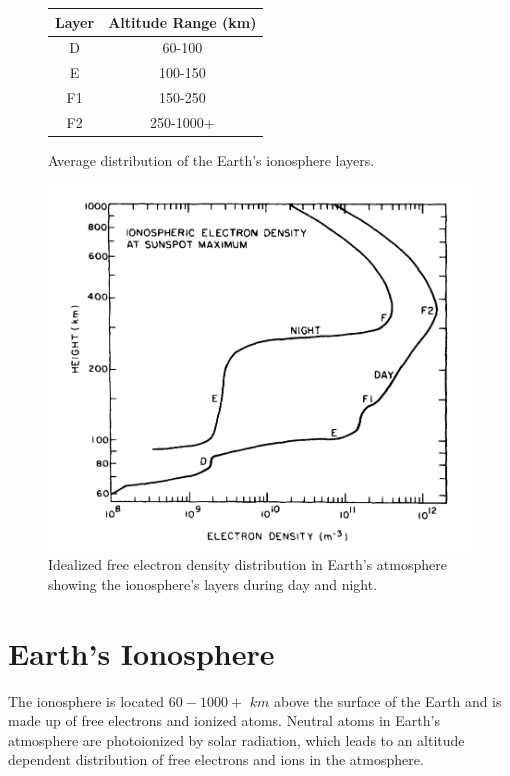 \begin{figure}[htb]
\centering
\begin{minipage}[b]{0.48\textwidth}
\centering
\begin{tabular}{|c|c|}
\hline
Layer & Altitude Range (km) \\
\hline
D & 60-100 \\
\hline
E & 100-150 \\
\hline
F1 & 150-250 \\
\hline
F2 & 250-1000+ \\
\hline
\end{tabular}
\caption{Average distribution of the Earth's ionosphere layers.}
\label{Tab:iono_layer}
\vspace{2cm}
\end{minipage}%
\begin{minipage}[b]{0.02\textwidth}
\hspace{1cm}
\end{minipage}%
\begin{minipage}[b]{0.48\textwidth}
\centering
\includegraphics[width=0.95\linewidth]{Ionosphere/figures/atmosphere_layers.jpg}
\caption{Idealized free electron density distribution in Earth's atmosphere showing the ionosphere's layers during day and night. }
\label{Fig:iono_layer}
\end{minipage}
\end{figure}

\section{Earth's Ionosphere}
The ionosphere is located $60 - 1000+$ $km$ above the surface of the Earth and is made up of free electrons and ionized atoms. Neutral atoms in Earth's atmosphere are photoionized by solar radiation, which leads to an altitude dependent distribution of free electrons and ions in the atmosphere.

